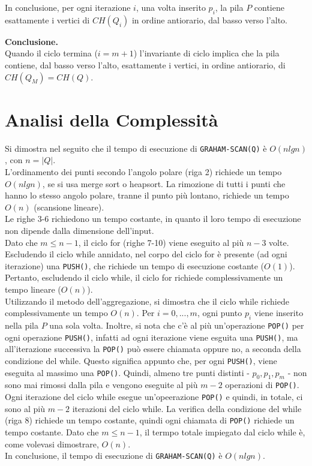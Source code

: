 \documentclass[12pt,a4paper]{report}
\begin{document}
\noindent In conclusione, per ogni iterazione $i$, una volta inserito $p_i$, la pila $P$ contiene esattamente i vertici di $CH(Q_i)$ in ordine antiorario, dal basso verso l'alto.

\vspace{0.5cm}

\noindent \textbf{Conclusione.}\\
Quando il ciclo termina ($i = m + 1$) l'invariante di ciclo implica che la pila contiene, dal basso verso l'alto, esattamente i vertici, in ordine antiorario, di $CH(Q_M) = CH(Q)$. 

\section{Analisi della Complessità}\label{ch:complessita}
\noindent Si dimostra nel seguito che il tempo di esecuzione di \texttt{GRAHAM-SCAN(Q)} è $O(nlgn)$, con $n = |Q|$.\\
L'ordinamento dei punti secondo l'angolo polare (riga 2) richiede un tempo $O(nlgn)$, se si usa merge sort o heapsort. La rimozione di tutti i punti che hanno lo stesso angolo polare, tranne il punto più lontano, richiede un tempo $O(n)$ (scansione lineare).\\
Le righe 3-6 richiedono un tempo costante, in quanto il loro tempo di esecuzione non dipende dalla dimensione dell'input.\\
Dato che $m \leq n - 1$, il ciclo for (righe 7-10) viene eseguito al più $n - 3$ volte. Escludendo il ciclo while annidato, nel corpo del ciclo for è presente (ad ogni iterazione) una \texttt{PUSH()}, che richiede un tempo di esecuzione costante ($O(1)$). Pertanto, escludendo il ciclo while, il ciclo for richiede complessivamente un tempo lineare ($O(n)$).\\
Utilizzando il metodo dell'aggregazione, si dimostra che il ciclo while richiede complessivamente un tempo $O(n)$. Per $i = 0, ..., m$, ogni punto $p_i$ viene inserito nella pila $P$ una sola volta. Inoltre, si nota che c'è al più un'operazione \texttt{POP()} per ogni operazione \texttt{PUSH()}, infatti ad ogni iterazione viene esguita una \texttt{PUSH()}, ma all'iterazione successiva la \texttt{POP()} può essere chiamata oppure no, a seconda della condizione del while. Questo significa appunto che, per ogni \texttt{PUSH()}, viene eseguita al massimo una \texttt{POP()}. Quindi, almeno tre punti distinti - $p_0, p_1, p_m$ - non sono mai rimossi dalla pila e vengono eseguite al più $m - 2$ operazioni di \texttt{POP()}. Ogni iterazione del ciclo while esegue un'opeerazione \texttt{POP()} e quindi, in totale, ci sono al più $m - 2$ iterazioni del ciclo while. La verifica della condizione del while (riga 8) richiede un tempo costante, quindi ogni chiamata di \texttt{POP()} richiede un tempo costante. Dato che $m \leq n - 1$, il termpo totale impiegato dal ciclo while è, come volevasi dimostrare, $O(n)$.\\
In conclusione, il tempo di esecuzione di \texttt{GRAHAM-SCAN(Q)} è $O(nlgn)$.
\end{document}
